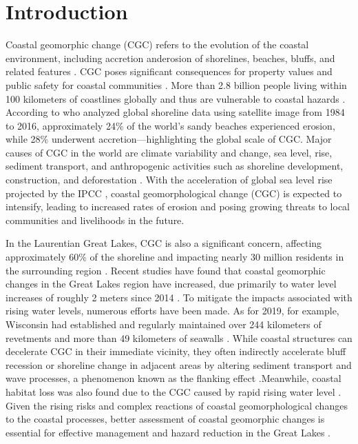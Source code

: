 \section{Introduction} 
\label{Introduction} 
Coastal geomorphic change (CGC) refers to the evolution of the coastal
environment, including accretion anderosion of shorelines, beaches, bluffs, and
related features \citep{vitousek2024scalable}. CGC poses significant consequences for
property values and public safety for coastal communities \citep{allen2019linking}.
More than 2.8 billion people living within 100 kilometers of coastlines globally
and thus are vulnerable to coastal hazards \citep{martinez2007coasts,
cosby_accelerating_2024}.  According to \citet{luijendijk_state_2018} who
analyzed global shoreline data using satellite image from 1984 to 2016,
approximately 24\% of the world’s sandy beaches experienced erosion, while 28\%
underwent accretion—highlighting the global scale of CGC. Major causes of CGC in
the world are climate variability and change, sea level, rise, sediment
transport, and anthropogenic activities such as shoreline development,
construction, and deforestation \citep{mangor2004shoreline}.  With the acceleration of
global sea level rise projected by the IPCC \citep{siegert2020twenty}, coastal
geomorphological change (CGC) is expected to intensify, leading to increased
rates of erosion and posing growing threats to local communities and livelihoods
in the future.  

In the Laurentian Great Lakes, CGC is also a significant concern, affecting
approximately 60\% of the shoreline and impacting nearly 30 million residents in
the surrounding region
\citep{mickelson1977shoreline,mickelson2004erosion,brown_factors_2005,jackson_coastal_2013}.
Recent studies have found that coastal geomorphic changes in the Great Lakes
region have increased, due primarily to water level increases of roughly 2
meters since 2014 \citep{gronewold_hydrological_2016,gronewold_tug--war_2021}.
To mitigate the impacts associated with rising water levels, numerous efforts
have been made. As for 2019, for example, Wisconsin had established and
regularly maintained over 244 kilometers of revetments and more than 49
kilometers of seawalls \citep{mickelson2007wisconsin}. While coastal structures
can decelerate CGC in their immediate vicinity, they often indirectly accelerate
bluff recession or shoreline change in adjacent areas by altering sediment
transport and wave processes, a phenomenon known as the flanking effect
\citep{brown2012human,lin_field_2014}.Meanwhile, coastal habitat loss was also
found due to the CGC caused by rapid rising water level
\citep{theuerkauf_rapid_2021}. Given the rising risks and complex reactions of
coastal geomorphological changes to the coastal processes, better assessment of
coastal geomorphic changes is essential for effective management and hazard
reduction in the Great Lakes \citep{lawrence1994natural}.

